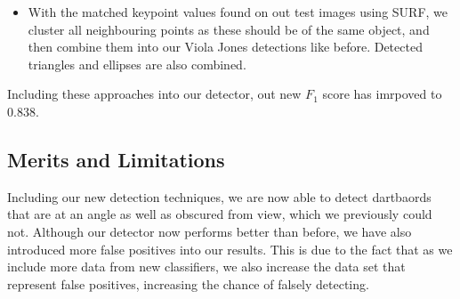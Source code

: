 \documentclass[a4paper]{article}
\begin{document}
\begin{itemize}
\item With the matched keypoint values found on out test images using SURF, we
  cluster all neighbouring points as these should be of the same object, and
    then combine them into our Viola Jones detections like before. Detected
    triangles and ellipses are also combined.


\end{itemize}
Including these approaches into our detector, out new \(F_{1}\) score has imrpoved to 0.838.


\vspace{-2em}
\begin{figure}[H]
  \centering
  \hfill
  \hfill
  \hfill
  \hfill
\end{figure}

\subsection*{Merits and Limitations}
Including our new detection techniques, we are now able to detect dartbaords
that are at an angle as well as obscured from view, which we previously could
not. Although our detector now performs better than before, we have also
introduced more false positives into our results. This is due to the fact that
as we include more data from new classifiers, we also increase the data set
that represent false positives, increasing the chance of falsely detecting.
\end{document}
